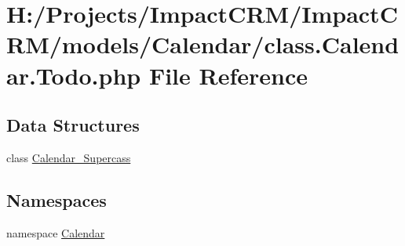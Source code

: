 \hypertarget{class_8Calendar_8Todo_8php}{
\section{H:/Projects/ImpactCRM/ImpactCRM/models/Calendar/class.Calendar.Todo.php File Reference}
\label{class_8Calendar_8Todo_8php}
}
\subsection*{Data Structures}
\begin{DoxyCompactItemize}
\item 
class \hyperlink{classCalendar__Supercass}{Calendar\_\-Supercass}
\end{DoxyCompactItemize}
\subsection*{Namespaces}
\begin{DoxyCompactItemize}
\item 
namespace \hyperlink{namespaceCalendar}{Calendar}
\end{DoxyCompactItemize}
